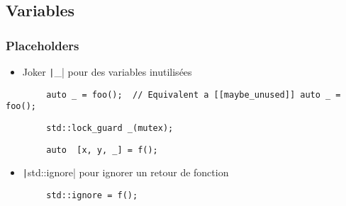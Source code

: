 \documentclass[C++.tex]{subfiles}
\begin{document}
\subsection*{Variables}
\begin{frame}[fragile]
	\frametitle{Placeholders}
	\begin{itemize}
		\item Joker \texttt|_| pour des variables inutilisées
	\end{itemize}

	\begin{verbatim}
		auto _ = foo();  // Equivalent a [[maybe_unused]] auto _ = foo();
	\end{verbatim}

	\begin{verbatim}
		std::lock_guard _(mutex);
	\end{verbatim}

	\begin{verbatim}
		auto  [x, y, _] = f();
	\end{verbatim}

	\begin{itemize}
		\item \texttt|std::ignore| pour ignorer un retour de fonction
	\end{itemize}

	\begin{verbatim}
		std::ignore = f();
	\end{verbatim}

	\begin{codesample}
		\sample{https://godbolt.org/#g:!((g:!((g:!((h:codeEditor,i:(filename:'1',fontScale:14,fontUsePx:'0',j:1,lang:c%

}
\end{codesample}
\end{frame}
\end{document}
